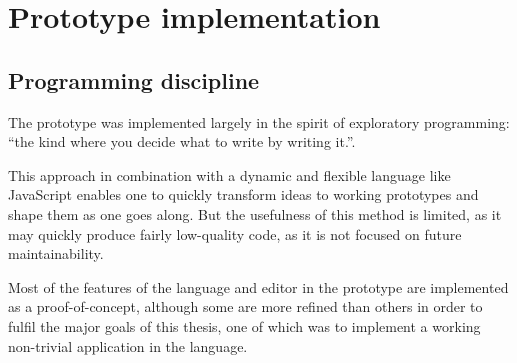 \chapter{Prototype implementation}\label{chap:impl}

\section{Programming discipline}
The prototype was implemented largely in the spirit of exploratory programming:
``the kind where you decide what to write by writing
it.''\cite{arc}.

This approach in combination with a dynamic and flexible language like
JavaScript enables one to quickly transform ideas to working prototypes and
shape them as one goes along. But the usefulness of this method is limited, as
it may quickly produce fairly low-quality code, as it is not focused on future
maintainability.

Most of the features of the language and editor in the prototype are implemented
as a proof-of-concept, although some are more refined than others in order to
fulfil the major goals of this thesis, one of which was to implement a working
non-trivial application in the language.

